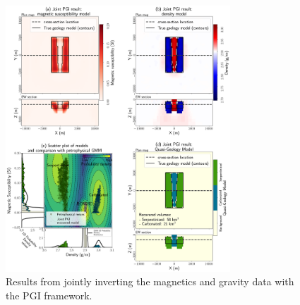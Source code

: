 \begin{figure}[!htb]
    \begin{center}
    \includegraphics[width=0.75\textwidth]{figures/Joint-PGI.png}
    \end{center}
\caption{
    Results from jointly inverting the magnetics and gravity data with the PGI framework.
}
\label{fig:joint-pgi}
\end{figure}
